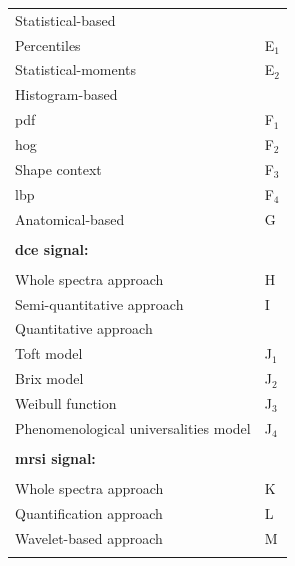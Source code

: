 \begin{table}
\begin{tabular}{p{.7\linewidth} >{\centering\arraybackslash}p{.20\linewidth}}
		\quad \quad Statistical-based & \\
		\quad \quad \quad Percentiles & E$_1$ \\
		\quad \quad \quad Statistical-moments & E$_2$ \\
		\quad \quad Histogram-based & \\
		\quad \quad \quad \Ac{pdf} & F$_1$ \\
		\quad \quad \quad \Ac{hog} & F$_2$ \\
		\quad \quad \quad Shape context & F$_3$ \\
		\quad \quad \quad \Ac{lbp} & F$_4$ \\
		\quad \quad Anatomical-based & G \\ \\ [-1.5ex]
		\textbf{\ac{dce} signal:} & \\ \\ [-1.5ex]
		\quad Whole spectra approach & H \\
		\quad Semi-quantitative approach & I \\
		\quad Quantitative approach &  \\
		\quad \quad Toft model & J$_1$ \\
		\quad \quad Brix model & J$_2$ \\
		\quad \quad Weibull function & J$_3$ \\
		\quad \quad Phenomenological universalities model & J$_4$ \\
		\\ [-1.5ex]
		\textbf{\ac{mrsi} signal:} & \\ \\ [-1.5ex]
		\quad Whole spectra approach & K \\
		\quad Quantification approach & L \\
		\quad Wavelet-based approach & M \\ \\ [-1.5ex]
		\hline
	\end{tabular}
	\label{tab:feat}
\end{table}

